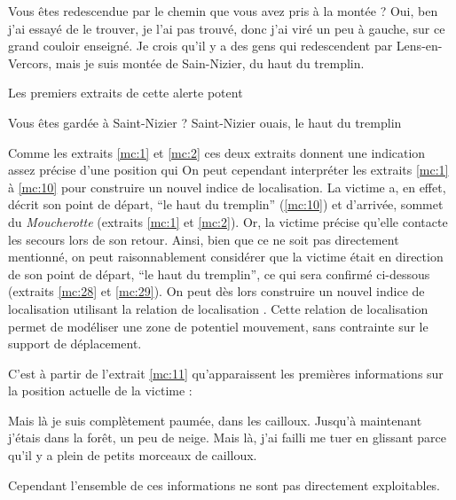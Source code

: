 \begin{dialogue*}
  \Sec {} Vous êtes redescendue par le chemin que
  vous avez pris à la montée ?
  \Req {} Oui, ben j’ai essayé de le trouver, je l’ai pas
  trouvé,  donc j’ai viré un peu à gauche,
   sur ce grand couloir enseigné.  Je
  crois qu’il y a des gens qui redescendent par Lens-en-Vercors,
   mais je suis montée de Sain-Nizier, du haut du
  tremplin.
\end{dialogue*}
% 
Les premiers extraits de cette alerte potent

\begin{dialogue*}
  \Sec {} Vous êtes gardée à Saint-Nizier ?
  \Req {} Saint-Nizier ouais, le haut du tremplin
\end{dialogue*}
% 
Comme les extraits \ref{mc:1} et \ref{mc:2} ces deux extraits donnent
une indication assez précise d'une position qui
%
On peut cependant interpréter les extraits \ref{mc:1} à \ref{mc:10}
pour construire un nouvel indice de localisation. La victime a, en
effet, décrit son point de départ, \enquote{le haut du tremplin}
(\ref{mc:10}) et d'arrivée, sommet du \emph{Moucherotte} (extraits
\ref{mc:1} et \ref{mc:2}). Or, la victime précise qu'elle contacte les
secours lors de son retour. Ainsi, bien que ce ne soit pas directement
mentionné, on peut raisonnablement considérer que la victime était en
direction de son point de départ, \enquote{le haut du tremplin}, ce
qui sera confirmé ci-dessous (extraits \ref{mc:28} et \ref{mc:29}). On
peut dès lors construire un nouvel indice de localisation utilisant la
relation de localisation
. Cette relation de
localisation permet de modéliser une zone de potentiel mouvement, sans
contrainte sur le support de déplacement.


C'est à partir de l'extrait \ref{mc:11} qu'apparaissent les premières
informations sur la position actuelle de la victime :
%
\begin{dialogue*}
  \Req {} Mais là je suis complètement paumée,
   dans les cailloux.  Jusqu’à
  maintenant j’étais dans la forêt,  un peu de
  neige.  Mais là, j’ai failli me tuer en glissant
   parce qu’il y a plein de petits morceaux de
  cailloux.
\end{dialogue*}
% 
Cependant l'ensemble de ces informations ne sont pas directement
exploitables.

